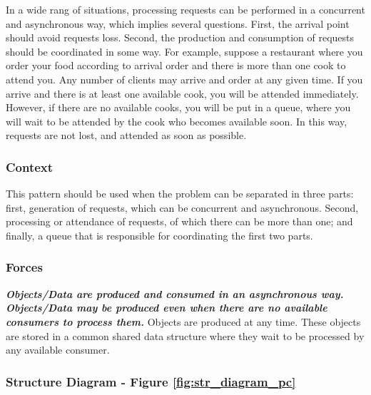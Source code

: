 In a wide rang of situations, processing requests can be performed in a concurrent and asynchronous way, which implies several questions. First, the arrival point should avoid requests loss. Second, the production and consumption of requests should be coordinated in some way. For example, suppose a restaurant where you order your food according to arrival order and there is more than one cook to attend you. Any number of clients may arrive and order at any given time. If you arrive and there is at least one available cook, you will be attended immediately. However, if there are no available cooks, you will be put in a queue, where you will wait to be attended by the cook who becomes available soon. In this way, requests are not lost, and attended as soon as possible.

\subsubsection{Context}

This pattern should be used when the problem can be separated in three parts: first, generation of requests, which can be concurrent and asynchronous. Second, processing or attendance of requests, of which there can be more than one; and finally, a queue that is responsible for coordinating the first two parts. 

\subsubsection{Forces}

\noindent\textbf{\textit{Objects/Data are produced and consumed in an asynchronous way.}}\\

\noindent\textbf{\textit{Objects/Data may be produced even when there are no available consumers to process them. }}Objects are produced at any time. These objects are stored in a common shared data structure where they wait to be processed by any available consumer.


\subsubsection{Structure Diagram - Figure \ref{fig:str_diagram_pc}}


